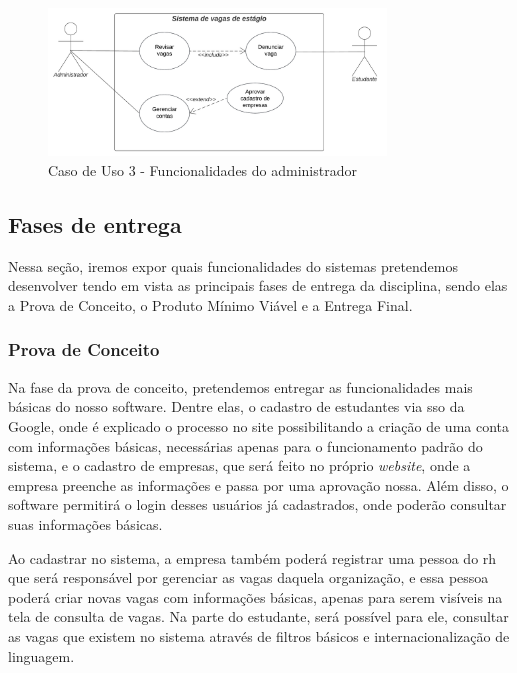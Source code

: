 \begin{figure}[H]
	\centering 
	\caption{\label{fig:caso3}Caso de Uso 3 - Funcionalidades do administrador}
	\includegraphics[width=0.8\textwidth]{imagens/caso-de-uso-3.png} 
\end{figure}

\subsection{Fases de entrega}

Nessa seção, iremos expor quais funcionalidades do sistemas pretendemos desenvolver tendo em vista as principais fases de entrega da disciplina, sendo elas a Prova de Conceito, o Produto Mínimo Viável e a Entrega Final.

\subsubsection{Prova de Conceito}

Na fase da prova de conceito, pretendemos entregar as funcionalidades mais básicas do nosso software. Dentre elas, o cadastro de estudantes via \ac{sso} da Google, onde é explicado o processo no site possibilitando a criação de uma conta com informações básicas, necessárias apenas para o funcionamento padrão do sistema, e o cadastro de empresas, que será feito no próprio \emph{website}, onde a empresa preenche as informações e passa por uma aprovação nossa. Além disso, o software permitirá o login desses usuários já cadastrados, onde poderão consultar suas informações básicas.

Ao cadastrar no sistema, a empresa também poderá registrar uma pessoa do \ac{rh} que será responsável por gerenciar as vagas daquela organização, e essa pessoa poderá criar novas vagas com informações básicas, apenas para serem visíveis na tela de consulta de vagas.
Na parte do estudante, será possível para ele, consultar as vagas que existem no sistema através de filtros básicos e internacionalização de linguagem.

